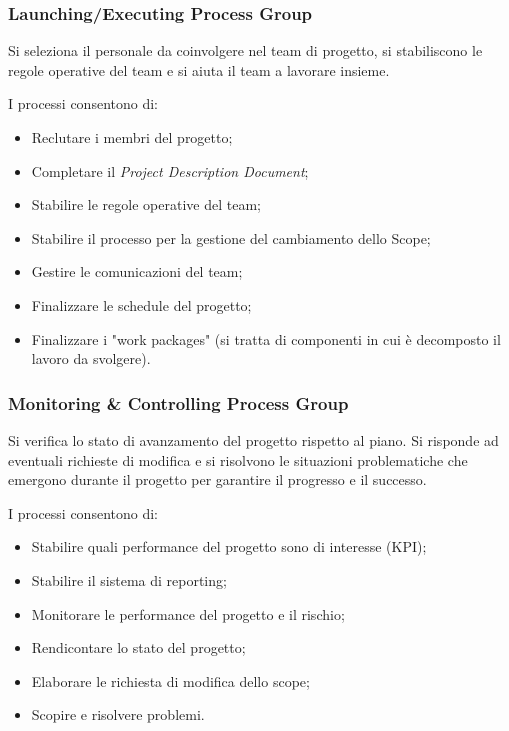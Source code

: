 \subsubsection{Launching/Executing Process Group}
\begin{info}
	Si seleziona il personale da coinvolgere nel team di progetto, si stabiliscono le regole operative del team e si aiuta il team a lavorare insieme.
\end{info}
I processi consentono di:
\begin{itemize}
	\item Reclutare i membri del progetto;
	\item Completare il \textit{Project Description Document};
	\item Stabilire le regole operative del team;
	\item Stabilire il processo per la gestione del cambiamento dello Scope;
	\item Gestire le comunicazioni del team;
	\item Finalizzare le schedule del progetto;
	\item Finalizzare i "work packages" (si tratta di componenti in cui è decomposto il lavoro da svolgere).
\end{itemize}
\subsubsection{Monitoring \& Controlling Process Group}
\begin{info}
	Si verifica lo stato di avanzamento del progetto rispetto al piano. Si risponde ad eventuali richieste di modifica e si risolvono le situazioni problematiche che emergono durante il progetto per garantire il progresso e il successo.
\end{info}
I processi consentono di:
\begin{itemize}
	\item Stabilire quali performance del progetto sono di interesse (KPI);
	\item Stabilire il sistema di reporting;
	\item Monitorare le performance del progetto e il rischio;
	\item Rendicontare lo stato del progetto;
	\item Elaborare le richiesta di modifica dello scope;
	\item Scopire e risolvere problemi.
\end{itemize}
